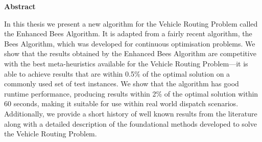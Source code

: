 \begin{center}
   \begin{minipage}{300pt}
   \begin{center}
      \textbf{Abstract}
   \end{center}
   In this thesis we present a new algorithm for the Vehicle Routing Problem called the Enhanced Bees Algorithm. It is adapted from a fairly recent algorithm, the Bees Algorithm, which was developed for continuous optimisation problems. We show that the results obtained by the Enhanced Bees Algorithm are competitive with the best meta-heuristics available for the Vehicle Routing Problem---it is able to achieve results that are within 0.5\% of the optimal solution on a commonly used set of test instances. We show that the algorithm has good runtime performance, producing results within 2\% of the optimal solution within 60 seconds, making it suitable for use within real world dispatch scenarios. Additionally, we provide a short history of well known results from the literature along with a detailed description of the foundational methods developed to solve the Vehicle Routing Problem.
   \end{minipage}
\end{center}

\cleardoublepage
